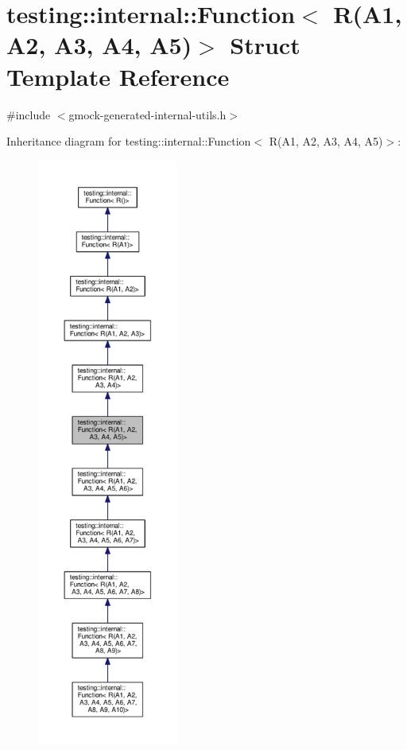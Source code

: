 \hypertarget{structtesting_1_1internal_1_1_function_3_01_r_07_a1_00_01_a2_00_01_a3_00_01_a4_00_01_a5_08_4}{}\section{testing\+:\+:internal\+:\+:Function$<$ R(A1, A2, A3, A4, A5)$>$ Struct Template Reference}
\label{structtesting_1_1internal_1_1_function_3_01_r_07_a1_00_01_a2_00_01_a3_00_01_a4_00_01_a5_08_4}


{\ttfamily \#include $<$gmock-\/generated-\/internal-\/utils.\+h$>$}



Inheritance diagram for testing\+:\+:internal\+:\+:Function$<$ R(A1, A2, A3, A4, A5)$>$\+:
\nopagebreak
\begin{figure}[H]
\begin{center}
\leavevmode
\includegraphics[height=550pt]{structtesting_1_1internal_1_1_function_3_01_r_07_a1_00_01_a2_00_01_a3_00_01_a4_00_01_a5_08_4__inherit__graph}
\end{center}
\end{figure}


